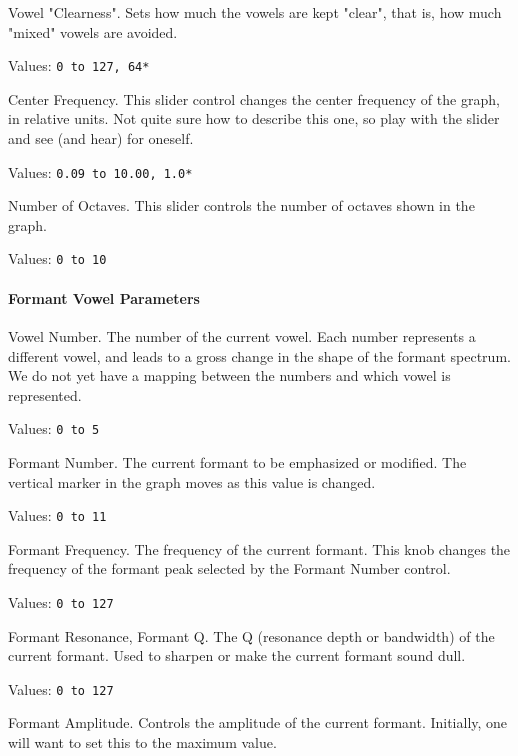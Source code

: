    Vowel "Clearness".
   Sets how much the vowels are kept "clear",
   that is, how much "mixed" vowels are avoided.

   Values:  \texttt{0 to 127, 64*}

   Center Frequency.
   This slider control changes the center frequency of the graph, in relative
   units.  Not quite sure how to describe this one, so play with the slider and
   see (and hear) for oneself.

   Values:  \texttt{0.09 to 10.00, 1.0*}

   Number of Octaves.
   This slider controls the number of octaves shown in the graph.

   Values:  \texttt{0 to 10}

\paragraph{Formant Vowel Parameters}
\label{paragraph:formant_vowel_parameters}

   Vowel Number.
   The number of the current vowel.
   Each number represents a different vowel, and leads to a gross change in the
   shape of the formant spectrum.
   We do not yet have a mapping between the numbers and which vowel is
   represented.

   Values:  \texttt{0 to 5}

   Formant Number.
   The current formant to be emphasized or modified.  The vertical marker in
   the graph moves as this value is changed.

   Values:  \texttt{0 to 11}

   Formant Frequency.
   The frequency of the current formant.
   This knob changes the frequency of the formant peak selected by the
   Formant Number control.

   Values:  \texttt{0 to 127}

   Formant Resonance, Formant Q.
   The Q (resonance depth or bandwidth) of the current formant.
   Used to sharpen or make the current formant sound dull.

   Values:  \texttt{0 to 127}

   Formant Amplitude.
   Controls the amplitude of the current formant.
   Initially, one will want to set this to the maximum value.


